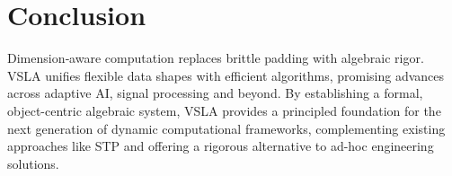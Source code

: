 \section{Conclusion}
Dimension‑aware computation replaces brittle padding with algebraic rigor.  VSLA unifies flexible data shapes with efficient algorithms, promising advances across adaptive AI, signal processing and beyond. By establishing a formal, object-centric algebraic system, VSLA provides a principled foundation for the next generation of dynamic computational frameworks, complementing existing approaches like STP and offering a rigorous alternative to ad-hoc engineering solutions.

